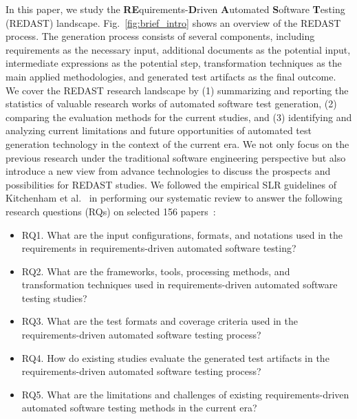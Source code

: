 In this paper, we study the \textbf{RE}quirements-\textbf{D}riven \textbf{A}utomated \textbf{S}oftware \textbf{T}esting (REDAST) landscape. Fig.~\ref{fig:brief_intro} shows an overview of the REDAST process. The generation process consists of several components, including requirements as the necessary input, additional documents as the potential input, intermediate expressions as the potential step, transformation techniques as the main applied methodologies, and generated test artifacts as the final outcome. We cover the REDAST research landscape by (1) summarizing and reporting the statistics of valuable research works of automated software test generation, (2) comparing the evaluation methods for the current studies, and (3) identifying and analyzing current limitations and future opportunities of automated test generation technology in the context of the current era. We not only focus on the previous research under the traditional software engineering perspective but also introduce a new view from advance technologies to discuss the prospects and possibilities for REDAST studies. We followed the empirical SLR guidelines of Kitchenham et al.~\cite{kitchenham2022segress} in performing our systematic review to answer the following research questions (RQs) on selected 156 papers~:

\begin{itemize}
    \item RQ1. What are the input configurations, formats, and notations used in the requirements in requirements-driven automated software testing?
    \item RQ2. What are the frameworks, tools, processing methods, and transformation techniques used in requirements-driven automated software testing studies?
    \item RQ3. What are the test formats and coverage criteria used in the requirements-driven automated software testing process?
    \item RQ4. How do existing studies evaluate the generated test artifacts in the requirements-driven automated software testing process?
    \item RQ5. What are the limitations and challenges of existing requirements-driven automated software testing methods in the current era?
\end{itemize}


